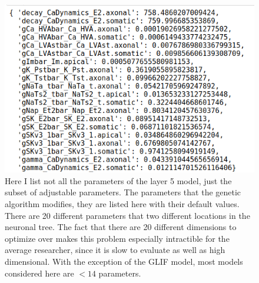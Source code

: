 \begin{figure}
    \begin{center}
    \includegraphics{figures/parameters_opt_l5pc.png}
    \caption[Subset of modal parameters eligible for tuning in L5PC neuron]{Here I list not all the parameters of the layer 5 model, just the subset of adjustable parameters. The parameters that the genetic algorithm modifies, they are listed here with their default values. There are 20 different parameters that two different locations in the neuronal tree. The fact that there are 20 different dimensions to optimize over makes this problem especially intractible for the average researcher, since it is slow to evaluate as well as high dimensional. With the exception of the GLIF model, most models considered here are $<14$ parameters.}
    \label{fig:ca1_parameters}
    \end{center}
\end{figure}





